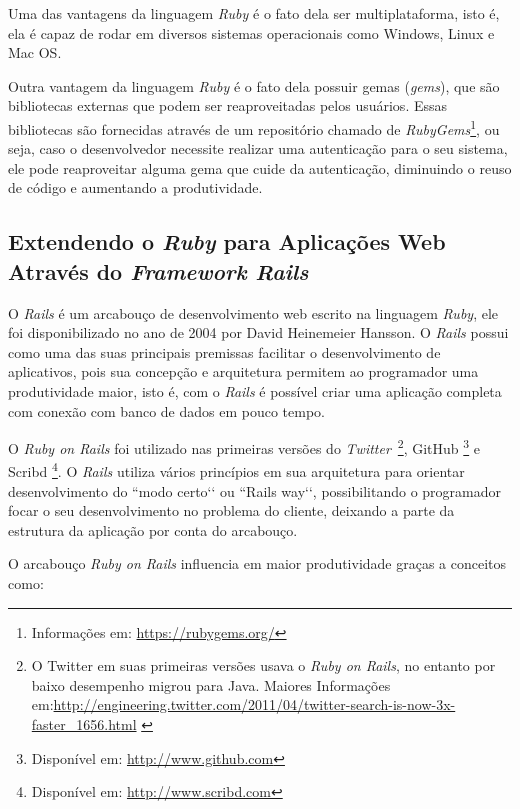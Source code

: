 Uma das vantagens da linguagem \textit{Ruby} é o fato dela ser multiplataforma, isto é, ela é capaz de rodar em diversos sistemas operacionais como Windows, Linux e Mac OS.

Outra vantagem da linguagem \textit{Ruby} é o fato dela possuir gemas (\textit{gems}), que são bibliotecas externas que podem ser reaproveitadas pelos usuários. Essas bibliotecas são fornecidas através de um repositório chamado de \textit{RubyGems}\footnote{Informações em: \url{https://rubygems.org/}}, ou seja, caso o desenvolvedor necessite realizar uma autenticação para o seu sistema, ele pode reaproveitar alguma gema que cuide da autenticação, diminuindo o reuso de código e aumentando a produtividade.

\subsection{Extendendo o \textit{Ruby} para Aplicações Web Através do \textit{Framework Rails}}
\label{sub:frameworkrails}

O \textit{Rails} é um arcabouço de desenvolvimento web escrito na linguagem \textit{Ruby}, ele foi disponibilizado no ano de 2004 por David Heinemeier Hansson. O \textit{Rails} possui como uma das suas principais premissas facilitar o desenvolvimento de aplicativos, pois sua concepção e arquitetura permitem ao programador uma produtividade maior, isto é, com o \textit{Rails} é possível criar uma aplicação completa com conexão com banco de dados em pouco tempo. 

O \textit{Ruby on Rails} foi utilizado nas primeiras versões do \textit{Twitter}~\footnote{O Twitter em suas primeiras versões usava o \textit{Ruby on Rails}, no entanto por baixo desempenho migrou para Java. Maiores Informações em:\url{http://engineering.twitter.com/2011/04/twitter-search-is-now-3x-faster_1656.html} \label{ft:twitterjava}}, GitHub \footnote{Disponível em: \url{http://www.github.com}} e Scribd \footnote{Disponível em: \url{http://www.scribd.com}}. O \textit{Rails} utiliza vários princípios em sua arquitetura para orientar desenvolvimento do ``modo certo‘‘ ou ``Rails way‘‘, possibilitando o programador focar o seu desenvolvimento no problema do cliente, deixando a parte da estrutura da aplicação por conta do arcabouço. \cite{meneses2014mezuro}

O arcabouço \textit{Ruby on Rails} influencia em maior produtividade graças a conceitos como:

